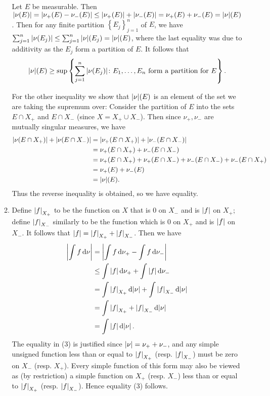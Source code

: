 \documentclass[11pt]{article}
\newcommand{\cbr}[1]{\left\{#1\right\}}
\begin{document}
\begin{enumerate}
\begin{enumerate}
    Let $E$ be measurable. Then $\abs{\nu(E)} = \abs{\nu_+(E) - \nu_-(E)}\leq \abs{\nu_+(E)} + \abs{\nu_-(E)} = {\nu_+(E)} +{\nu_-(E)} = \abs{\nu}(E)$. Then for any finite partition $\cbr{E_j}_{j=1}^n$ of $E$, we have $\sum_{j=1}^n\abs{\nu(E_j)}\leq \sum_{j=1}^n\abs{\nu}(E_j) = \abs{\nu}(E)$, where the last equality was due to additivity as the $E_j$ form a partition of $E$. It follows that \[\abs{\nu}(E) \geq \sup\cbr{\sum_{j=1}^n\abs{\nu(E_j)}\colon E_1,\dots,E_n \text{ form a partition for $E$}}.\]

    For the other inequality we show that $\abs{\nu}(E)$ is an element of the set we are taking the supremum over: Consider the partition of $E$ into the sets $E\cap X_+$ and $E\cap X_-$ (since $X= X_+\cup X_-$). Then since $\nu_+,\nu_-$ are mutually singular measures, we have \begin{align*}
      \abs{\nu(E\cap X_+)} + \abs{\nu(E\cap X_-)} &= \abs{\nu_+(E\cap X_+)} + \abs{\nu_-(E\cap X_-)}  \\
      &= {\nu_+(E\cap X_+)} + {\nu_-(E\cap X_-)}\\
      &={\nu_+(E\cap X_+)} + \nu_+(E\cap X_-) + {\nu_-(E\cap X_-)} + \nu_-(E\cap X_+)\\
      &= \nu_+(E) + \nu_-(E)\\
      &= \abs{\nu}(E).
    \end{align*} Thus the reverse inequality is obtained, so we have equality.
    \item Define $\abs{f}_{X_+}$ to be the function on $X$ that is $0$ on $X_-$ and is $\abs{f}$ on $X_+$; define $\abs{f}_{X_-}$ similarly to be the function which is $0$ on $X_+$ and is $\abs{f}$ on $X_-$. It follows that $\abs{f} = \abs{f}_{X_+} + \abs{f}_{X_-}$. Then we have \begin{align}
      \abs{\int f\dd{\nu}} &= \abs{\int f\dd{\nu_+} - \int f \dd{\nu_-}}\\
      &\leq \int\abs{f}\dd{\nu_+} + \int\abs{f}\dd{\nu_-}\\
      &=\int\abs{f}_{X_+}\dd{\abs{\nu}} + \int\abs{f}_{X_-}\dd{\abs{\nu}}\\
      &=\int \abs{f}_{X_+} + \abs{f}_{X_-}\dd{\abs{\nu}}\\
      &= \int \abs{f}\dd{\abs{\nu}}.
    \end{align} The equality in (3) is justified since $\abs{\nu} = \nu_+ +\nu_-$, and any simple unsigned function less than or equal to $\abs{f}_{X_+}$ (resp. $\abs{f}_{X_-}$) must be zero on $X_-$ (resp. $X_+$). Every simple function of this form may also be viewed as (by restriction) a simple function on $X_+$ (resp. $X_-$) less than or equal to $\abs{f}_{X_+}$ (resp. $\abs{f}_{X_-}$). Hence equality (3) follows.
  \end{enumerate}
\end{enumerate}
\end{document}
